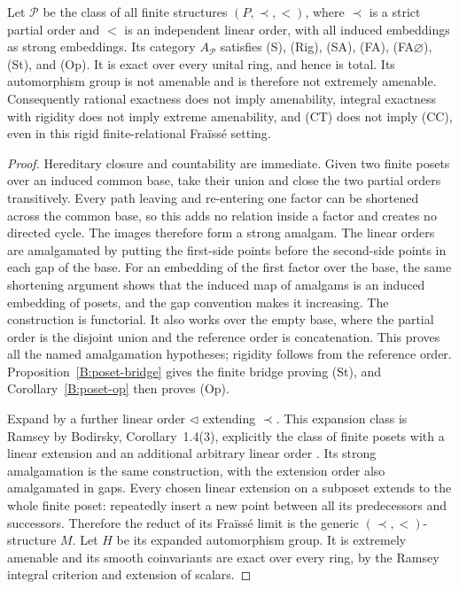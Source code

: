 \begin{theorem}
\label{A:ordered-posets}
Let $\mathcal P$ be the class of all finite structures $(P,\prec,<)$,
where $\prec$ is a strict partial order and $<$ is an independent
linear order, with all induced embeddings as strong embeddings.
Its category $A_{\mathcal P}$ satisfies (S), (Rig), (SA), (FA),
(FA$\varnothing$), (St), and (Op). It is exact over every unital ring, and hence is
total. Its automorphism group is not amenable and is therefore not
extremely amenable. Consequently rational exactness does not imply
amenability, integral exactness with rigidity does not imply extreme
amenability, and (CT) does not imply (CC), even in this rigid
finite-relational Fra\"iss\'e setting.
\end{theorem}
\begin{proof}
Hereditary closure and countability are immediate. Given two finite
posets over an induced common base, take their union and close the
two partial orders transitively. Every path leaving and re-entering
one factor can be shortened across the common base, so this adds
no relation inside a factor and creates no directed cycle. The
images therefore form a strong amalgam. The linear orders are
amalgamated by putting the first-side points before the second-side
points in each gap of the base. For an embedding of the first
factor over the base, the same shortening argument shows that the
induced map of amalgams is an induced embedding of posets, and the
gap convention makes it increasing. The construction is functorial.
It also works over the empty base, where the partial order is the
disjoint union and the reference order is concatenation. This
proves all the named amalgamation hypotheses; rigidity follows
from the reference order. Proposition~\ref{B:poset-bridge} gives
the finite bridge proving (St), and Corollary~\ref{B:poset-op}
then proves (Op).

Expand by a further linear order $\triangleleft$ extending
$\prec$. This expansion class is Ramsey by Bodirsky,
Corollary~1.4(3), explicitly the class of finite posets with a
linear extension and an additional arbitrary linear order
\cite{ABBodirsky2014}. Its strong amalgamation is the same
construction, with the extension order also amalgamated in gaps.
Every chosen linear extension on a subposet extends to the whole
finite poset: repeatedly insert a new point between all its
predecessors and successors. Therefore the reduct of its
Fra\"iss\'e limit is the generic $(\prec,<)$-structure $M$.
Let $H$ be its expanded automorphism group. It is extremely
amenable and its smooth coinvariants are exact over every ring,
by the Ramsey integral criterion and extension of scalars.


\end{proof}
